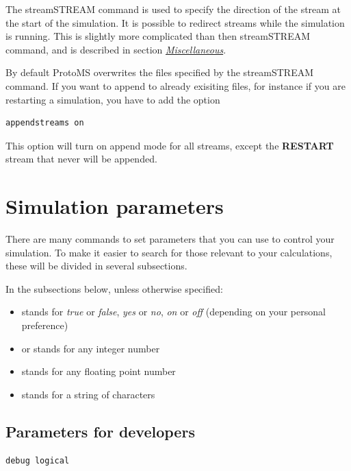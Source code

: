 \documentclass[letterpaper,10pt,english]{sphinxmanual}
\begin{document}
The streamSTREAM command is used to specify the direction of the stream at the start of the simulation. It is possible to redirect streams while the simulation is running. This is slightly more complicated than then streamSTREAM command, and is described in section {\hyperref[protoms:misccmd]{\emph{Miscellaneous}}}.

By default ProtoMS overwrites the files specified by the streamSTREAM command. If you want to append to already exisiting files, for instance if you are restarting a simulation, you have to add the option

\begin{Verbatim}[commandchars=\\\{\}]
appendstreams on
\end{Verbatim}

This option will turn on append mode for all streams, except the \textbf{RESTART} stream that never will be appended.


\section{Simulation parameters}
\label{protoms:parameters}\label{protoms:simulation-parameters}
There are many commands to set parameters that you can use to control your simulation. To make it easier to search for those relevant to your calculations, these will be divided in several subsections.

In the subsections below, unless otherwise specified:
\begin{itemize}
\item {} 
 stands for \emph{true} or \emph{false}, \emph{yes} or \emph{no}, \emph{on} or \emph{off} (depending on your personal preference)

\item {} 
 or  stands for any integer number

\item {} 
 stands for any floating point number

\item {} 
 stands for a string of characters

\end{itemize}


\subsection{Parameters for developers}
\label{protoms:parameters-for-developers}
\begin{Verbatim}[commandchars=\\\{\}]
debug logical
\end{Verbatim}
\end{document}
